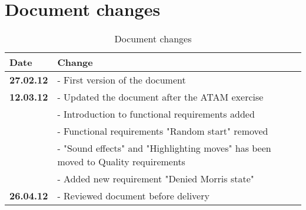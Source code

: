 \newpage

\section{Document changes}

\begin{table}[h!]
\begin{tabular}{ | p{90pt} | p{270pt}  |}
\hline
\bf Date & \bf Change \\ \hline
\bf 27.02.12  &  - First version of the document  \\ \hline
\bf 12.03.12 & - Updated the document after the ATAM exercise \\ 
& - Introduction to functional requirements added \\
& - Functional requirements "Random start" removed \\ 
& - "Sound effects" and "Highlighting moves" has been moved to Quality requirements \\
& - Added new requirement "Denied Morris state" \\ \hline
\bf 26.04.12 & - Reviewed document before delivery \\ \hline 

\end{tabular}
\caption{Document changes}
\end{table}